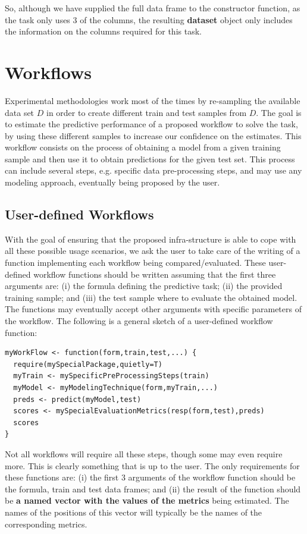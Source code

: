 \documentclass[10pt,a4paper]{article}
\begin{document}
So, although we have supplied the full data frame to the constructor
function, as the task only uses 3 of the columns, the resulting
\textbf{dataset} object only includes the information on the columns
required for this task.

\section{Workflows}

Experimental methodologies work most of the times by re-sampling the
available data set $D$ in order to create different train and test
samples from $D$. The goal is to estimate the predictive performance
of a proposed workflow to solve the task, by using these different
samples to increase our confidence on the estimates. This workflow
consists on the process of obtaining a model from a given training
sample and then use it to obtain predictions for the given test
set. This process can include several steps, e.g. specific data
pre-processing steps, and may use any modeling approach, eventually
being proposed by the user. 

\subsection{User-defined Workflows}

With the goal of ensuring that the
proposed infra-structure is able to cope with all these possible usage
scenarios, we ask the user to take care of the writing of a function
implementing each workflow being compared/evaluated. These
user-defined workflow functions should be written assuming that the
first three arguments are: (i) the formula defining the predictive
task; (ii) the provided training sample; and (iii) the test sample
where to evaluate the obtained model. The functions may eventually
accept other arguments with specific parameters of the workflow. The
following is a general sketch of a user-defined workflow function:

\begin{Verbatim}
myWorkFlow <- function(form,train,test,...) {
  require(mySpecialPackage,quietly=T)
  myTrain <- mySpecificPreProcessingSteps(train)
  myModel <- myModelingTechnique(form,myTrain,...)
  preds <- predict(myModel,test)
  scores <- mySpecialEvaluationMetrics(resp(form,test),preds)
  scores
}
\end{Verbatim}

Not all workflows will require all these steps, though some may even
require more. This is clearly something that is up to the user. The
only requirements for these functions are: (i) the first 3 arguments
of the workflow function should be the formula, train and test data
frames; and (ii) the result of the function should be \textbf{a named
  vector with the values of the metrics} being estimated. The names of
the positions of this vector will typically be the names of the
corresponding metrics.
\end{document}
